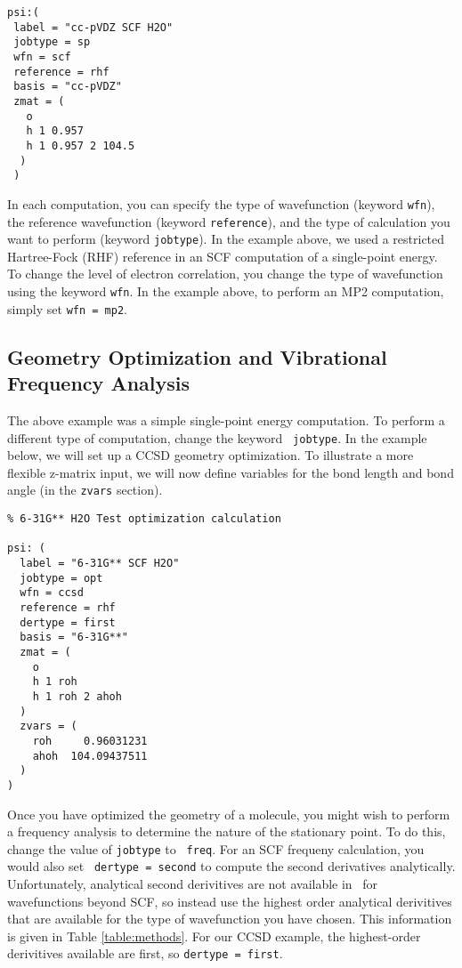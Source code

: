 \begin{verbatim}
psi:(
 label = "cc-pVDZ SCF H2O"
 jobtype = sp
 wfn = scf
 reference = rhf
 basis = "cc-pVDZ"
 zmat = (
   o
   h 1 0.957
   h 1 0.957 2 104.5
  )
 )

\end{verbatim}

In each computation, you can specify the type of wavefunction (keyword
{\tt wfn}), the reference wavefunction (keyword {\tt reference}), and
the type of calculation you want to perform (keyword {\tt jobtype}).
In the example above, we used a restricted Hartree-Fock (RHF) reference
in an SCF computation of a single-point energy.  To change the level
of electron correlation, you change the type of wavefunction using the
keyword {\tt wfn}.  In the example above, to perform an
MP2 computation, simply set {\tt wfn = mp2}.

\subsection{Geometry Optimization and Vibrational Frequency Analysis}
The above example was a simple single-point energy computation.
To perform a different type of computation, change the keyword {\tt
jobtype}.  In the example below, we will set up
a CCSD geometry optimization.  To illustrate a more flexible z-matrix
input, we will now define variables for the bond length and bond angle
(in the {\tt zvars} section).

\begin{verbatim}
% 6-31G** H2O Test optimization calculation

psi: (
  label = "6-31G** SCF H2O"
  jobtype = opt
  wfn = ccsd
  reference = rhf
  dertype = first
  basis = "6-31G**"
  zmat = (
    o
    h 1 roh
    h 1 roh 2 ahoh
  )
  zvars = (
    roh     0.96031231
    ahoh  104.09437511
  )
)
\end{verbatim}

Once you have optimized the geometry of a molecule, you might wish to
perform a frequency analysis to determine the nature of the stationary
point.  To do this, change the value of {\tt jobtype} to {\tt
freq}.  For an SCF frequeny calculation, you would also set {\tt
dertype = second} to compute the second derivatives analytically.
Unfortunately, analytical second derivitives are not available 
in \PSIthree\ for wavefunctions beyond SCF,
so instead use the highest order analytical derivitives
that are available for the type of wavefunction you have chosen.  This
information is given in Table \ref{table:methods}.  For our CCSD example, the
highest-order derivitives available are first, so {\tt dertype = first}.

